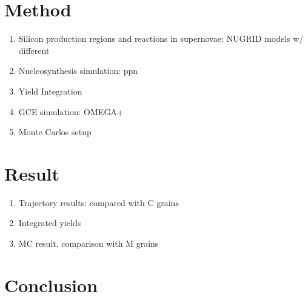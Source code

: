 \documentclass[letterpaper,12pt]{article}
\begin{document}
\section{Method}

\begin{enumerate}
    \item Silicon production regions and reactions in supernovae: NUGRID models w/ different 
    \item Nucleosynthesis simulation: ppn
    \item Yield Integration 
    \item GCE simulation: OMEGA+
    \item Monte Carlos setup
\end{enumerate}

\section{Result}
\begin{enumerate}
    \item Trajectory results: compared with C grains 
    \item Integrated yields 
    \item MC result, comparison with M grains
\end{enumerate}

\section{Conclusion}
\end{document}
